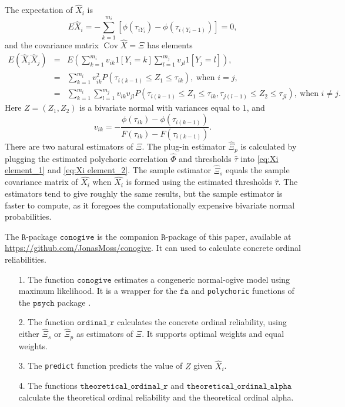 \documentclass[twoside]{article}
\DeclareMathOperator{\Cov}{Cov}
\begin{document}
The expectation of $\hat{X}_{i}$ is
\begin{equation*}
E\hat{X}_{i} = -\sum_{k=1}^{m_{i}}[\phi(\tau_{iY_{i}})-\phi(\tau_{i(Y_{i}-1)})]=0,
\end{equation*}
and the covariance matrix $\Cov\hat{X}=\Xi$ has elements
\begin{eqnarray}
E(\hat{X}_{i}\hat{X}_{j}) & = & E\left(\sum_{k=1}^{m_{i}}v_{ik}1[Y_{i}=k]\sum_{l=1}^{m_{j}}v_{jl}1[Y_{j}=l]\right),\nonumber \\
& = & \sum_{k=1}^{m_{i}}v_{ik}^2P(\tau_{i(k-1)}\leq Z_{1}\leq\tau_{ik}), \: \textrm{when } i = j, \label{eq:Xi element_1}\\
 & = & \sum_{k=1}^{m_{i}}\sum_{l=1}^{m_{j}}v_{ik}v_{jl}P(\tau_{i(k-1)}\leq Z_{1}\leq\tau_{ik},\tau_{j(l-1)}\leq Z_{2}\leq\tau_{jl}), \: \textrm{when } i\neq j.\label{eq:Xi element_2}
\end{eqnarray}
Here $Z=(Z_{1},Z_{2})$ is a bivariate normal with variances equal to $1$, and $$v_{ik}=-\frac{\phi(\tau_{ik})-\phi(\tau_{i(k-1)})}{F(\tau_{ik})-F(\tau_{i(k-1)})}.$$ There are two natural estimators of $\Xi$. The plug-in estimator $\hat{\Xi}_{p}$ is calculated by plugging the estimated polychoric correlation $\hat{\Phi}$ and thresholds $\hat{\tau}$ into \eqref{eq:Xi element_1} and \eqref{eq:Xi element_2}. The sample estimator $\hat{\Xi}_{s}$ equals the sample covariance matrix of $\hat{X_{i}}$ when $\hat{X_{i}}$ is formed using the estimated thresholds $\hat{\tau}$. The estimators tend to give roughly the same results, but the sample estimator is faster to compute, as it foregoes the computationally expensive bivariate normal probabilities. 

The $\mathtt{R}$-package $\mathtt{conogive}$ is the companion $\mathtt{R}$-package of this paper, available at \url{https://github.com/JonasMoss/conogive}. It can used to calculate concrete ordinal reliabilities. 
\begin{itemize}
\item[1.] The function $\mathtt{conogive}$ estimates a congeneric normal-ogive
model using maximum likelihood. It is a wrapper for the $\mathtt{fa}$ and \texttt{polychoric} functions of the $\mathtt{psych}$
package \citep{psych}.
\item[2.] The function $\mathtt{ordinal\_r}$ calculates the concrete ordinal
reliability, using either $\hat{\Xi}_{s}$ or $\hat{\Xi}_{p}$ as
estimators of $\Xi$. It supports optimal weights and equal weights.
\item[3.] The \texttt{predict} function predicts the value of $Z$ given $\hat{X}_i$.
\item[4.] The functions $\mathtt{theoretical\_ordinal\_r}$ and $\mathtt{theoretical\_ordinal\_alpha}$
calculate the theoretical ordinal reliability and the theoretical
ordinal alpha. 
\end{itemize}
\end{document}
